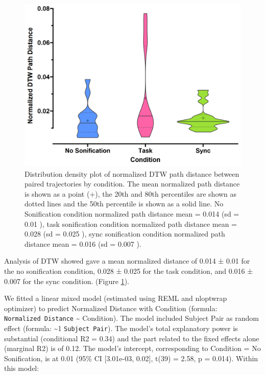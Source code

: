 \documentclass[10pt,a4paper,onecolumn]{article}
\begin{document}
\begin{figure}[h]

{\centering \includegraphics[width=1\linewidth]{figures/dtw_summary} 

}

\caption{Distribution density plot of normalized DTW path distance between paired trajectories by condition. The mean normalized path distance is shown as a point (+), the 20th and 80th percentiles are shown as dotted lines and the 50th percentile is shown as a solid line. No Sonification condition normalized path distance mean  =  0.014 (sd =  0.01 ), task sonification condition normalized path distance mean =  0.028 (sd =  0.025 ), sync sonification condition normalized path distance mean =  0.016 (sd =  0.007 ).}\label{fig:dtw-plot}
\end{figure}

Analysis of DTW showed gave a mean normalized distance of 0.014 ± 0.01 for the no sonification condition,
0.028 ± 0.025 for the task condition, and
0.016 ± 0.007 for the sync condition. (Figure \ref{fig:dtw-plot}).

We fitted a linear mixed model (estimated using REML and nloptwrap optimizer) to predict Normalized Distance with Condition (formula: \texttt{Normalized\ Distance} \textasciitilde{} Condition). The model included Subject Pair as random effect (formula: \textasciitilde1 \textbar{} \texttt{Subject\ Pair}). The model's total explanatory power is substantial (conditional R2 = 0.34) and the part related to the fixed effects alone (marginal R2) is of 0.12. The model's intercept, corresponding to Condition = No Sonification, is at 0.01 (95\% CI {[}3.01e-03, 0.02{]}, t(39) = 2.58, p = 0.014). Within this model:
\end{document}
